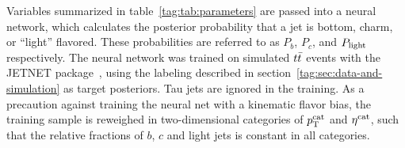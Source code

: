 Variables summarized in table~\ref{tag:tab:parameters} are passed into a neural
network, which calculates the posterior probability that a jet is bottom, charm, or ``light'' flavored. These probabilities are referred to as $P_b$, $P_c$, and $P_{\rm light}$ respectively. The neural network was trained on simulated $t \bar{t}$ events with the JETNET package~\cite{Peterson:1993nk}, using the labeling described in section~\ref{tag:sec:data-and-simulation} as target posteriors. Tau jets are ignored in the training. As a precaution against training the neural net with a kinematic flavor{} bias, the training sample is reweighed in two-dimensional categories of $p_{\rm T}^{\rm cat}$ and $\eta^{\rm cat}$, such that the relative  fractions of $b$, $c$ and light jets is constant in all categories.



